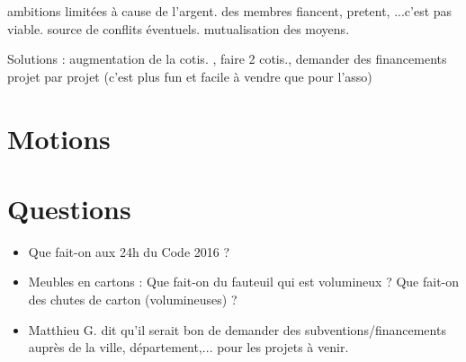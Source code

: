 \documentclass[11pt]{article}
\begin{document}
ambitions limitées à cause de l'argent. des membres fiancent, pretent, ...c'est pas viable. source de conflits éventuels. mutualisation des moyens.

Solutions : augmentation de la cotis. , faire 2 cotis., demander des financements projet par projet (c'est plus fun et facile à vendre que pour l'asso)

\section{Motions}

\section{Questions}

\begin{itemize}
	\item Que fait-on aux 24h du Code 2016 ?
	\item Meubles en cartons : Que fait-on du fauteuil qui est volumineux ? Que fait-on des chutes de carton (volumineuses) ?
	\item Matthieu G. dit qu'il serait bon de demander des subventions/financements auprès de la ville, département,... pour les projets à venir.
\end{itemize}
\end{document}
